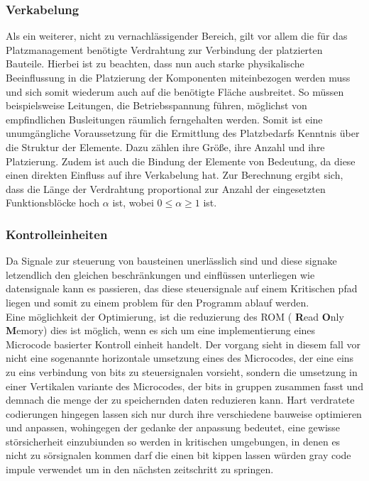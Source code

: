 \documentclass[conference]{IEEEtran}
\begin{document}
 \subsubsection{Verkabelung}
 Als ein weiterer, nicht zu vernachlässigender Bereich, gilt vor allem die für das Platzmanagement benötigte Verdrahtung zur Verbindung der platzierten Bauteile. Hierbei ist zu beachten, dass nun auch starke physikalische Beeinflussung in die Platzierung der Komponenten miteinbezogen werden muss und sich somit wiederum auch auf die benötigte Fläche ausbreitet. So müssen beispielsweise Leitungen, die Betriebsspannung führen, möglichst von empfindlichen Busleitungen räumlich ferngehalten werden.
Somit ist eine unumgängliche Voraussetzung für die Ermittlung des Platzbedarfs Kenntnis über die Struktur der Elemente. Dazu zählen ihre Größe, ihre Anzahl und ihre Platzierung. Zudem ist auch die Bindung der Elemente von Bedeutung, da diese einen direkten Einfluss auf ihre Verkabelung hat.\cite[S.157]{3}
Zur Berechnung ergibt sich, dass die Länge der Verdrahtung proportional zur Anzahl der eingesetzten Funktionsblöcke hoch $\alpha$ ist, wobei $0 \leq \alpha \geq 1$ ist.\cite[S.157]{3}\\
 \subsubsection{Kontrolleinheiten}
 Da Signale zur steuerung von bausteinen unerlässlich sind und diese signake letzendlich den gleichen beschränkungen und einflüssen unterliegen wie datensignale kann es passieren, das diese steuersignale auf einem Kritischen pfad liegen und somit zu einem problem für den Programm ablauf werden.\\
 Eine möglichkeit der Optimierung, ist die reduzierung des ROM ( \textbf{R}ead \textbf{O}nly \textbf{M}emory)
dies ist möglich, wenn es sich um eine implementierung eines Microcode basierter Kontroll einheit handelt. Der vorgang sieht in diesem fall vor nicht eine sogenannte horizontale umsetzung eines des Microcodes, der eine eins zu eins verbindung von bits zu steuersignalen vorsieht, sondern die umsetzung in einer Vertikalen variante des Microcodes, der bits in gruppen zusammen fasst und demnach die menge der zu speichernden daten reduzieren kann.
\cite[S.371-372]{2}
Hart verdratete codierungen hingegen lassen sich nur durch ihre verschiedene bauweise optimieren und anpassen, wohingegen der gedanke der anpassung bedeutet, eine gewisse störsicherheit einzubiunden so werden in kritischen umgebungen, in denen es nicht zu sörsignalen kommen darf die einen bit kippen lassen würden gray code impule verwendet um in den nächsten zeitschritt zu springen.\cite[S.373]{2}
\end{document}
